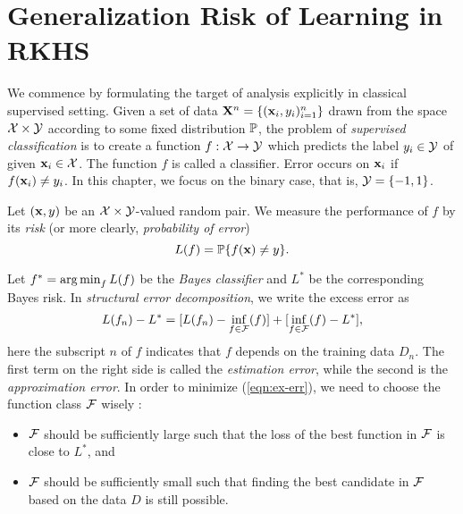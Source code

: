 \section{Generalization Risk of Learning in RKHS}

We commence by formulating the target of analysis explicitly in classical
supervised setting. Given a set of data $\mathbf X^n = \{(\mathbf{x}_i,y_i)_{i=1}^n\}$
drawn from the space ${\cal X} \times {\cal Y}$ according to some fixed distribution
${\mathbb P}$, the problem of {\em supervised classification} is to create a function
$f:{\cal X} \rightarrow {\cal Y}$ which predicts the label $y_i \in {\cal Y}$ of given $\mathbf{x}_i
\in {\cal X}$. The function $f$ is called a classifier. Error occurs on $\mathbf{x}_i$ if
$f(\mathbf{x}_i) \neq y_i$. In this chapter, we focus on the binary case, that is, ${\cal Y} =
\{-1,1\}$.


Let $(\mathbf{x},y)$ be an ${\cal X} \times {\cal Y}$-valued random pair. We measure the
performance of $f$ by its {\em risk} (or more clearly, {\em probability of
error})
\begin{equation}
L(f) = \p\{f(\x) \neq y\}. \label{eqn:err}
\end{equation}

Let $f^* = \argmin_{f} L(f)$ be the {\em Bayes classifier} and $L^*$ be
the corresponding Bayes risk. In {\em structural error decomposition}, we
write the excess error as \cite{ac/BousquetBL03,esiam/BousquetBL05}
\begin{equation}
L(f_n) - L^* = [L(f_n) - \inf_{f \in \f} (f)] + [\inf_{f \in \f}(f) - L^*], \label{eqn:ex-err}
\end{equation}
here the subscript $n$ of $f$ indicates that $f$ depends on the training
data $D_n$. The first term on the right side is called the {\em estimation
error}, while the second is the {\em approximation error}. In order to
minimize (\ref{eqn:ex-err}), we need to choose the function class ${\cal F}$
wisely \cite{ml/BartlettBL02}: \vspace{-0.1in}
\begin{itemize}
  \item ${\cal F}$ should be sufficiently large such that the loss of the best function in ${\cal F}$ is close to $L^*$,
   and \vspace{-0.1in}
  \item ${\cal F}$ should be sufficiently small such that finding the best candidate in ${\cal F}$ based on the data $D$ is still possible.
\end{itemize}

